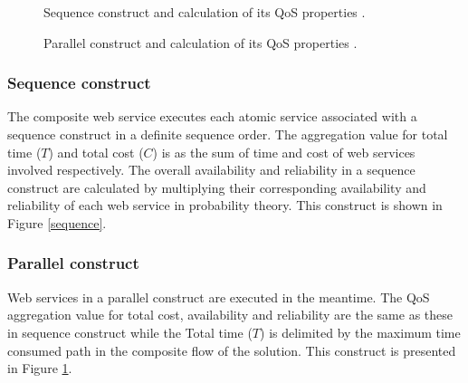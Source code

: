 \documentclass{llncs}
\begin{document}
\begin{figure}[h]
\centerline{
}
\caption{Sequence construct and calculation of its QoS properties
\cite{yu2013adaptive}.}
\label{sequence}
\vspace{0.3cm}
\centerline{
}
\caption{Parallel construct and calculation of its QoS properties
\cite{yu2013adaptive}.}
\label{parallel}
\end{figure}

\subsubsection{Sequence construct}
The composite web service executes each atomic service associated with a sequence construct in a definite sequence order. The aggregation value for total time ($T$) and total cost ($C$) is as the sum of time and cost of web services involved respectively. The overall availability and reliability in a sequence construct are calculated by multiplying their corresponding availability and reliability of each web service in probability theory. This construct is shown in Figure \ref{sequence}.
\subsubsection{Parallel construct}
Web services in a parallel construct are executed in the meantime. The QoS aggregation value for total cost, availability and reliability are the same as these in sequence construct while the Total time ($T$) is delimited by the maximum time consumed path in the composite flow of the solution. This construct is presented in Figure \ref{parallel}.
\end{document}
